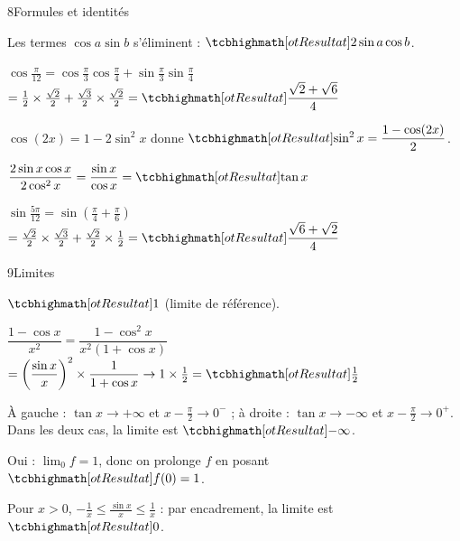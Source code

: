 \begin{deuxcolonnes}
\begin{corrige}{8}{Formules et identités}
\begin{questions}
  \item Les termes $\cos a\sin b$ s'éliminent : $\res{2\sin a\cos b}$.
  \item $\cos\frac{\pi}{12}=\cos\frac{\pi}{3}\cos\frac{\pi}{4}+\sin\frac{\pi}{3}\sin\frac{\pi}{4}$\\
    $=\frac12\times\frac{\sqrt2}{2}+\frac{\sqrt3}{2}\times\frac{\sqrt2}{2}=\res{\dfrac{\sqrt2+\sqrt6}{4}}$
  \item $\cos(2x)=1-2\sin^{2}x$ donne $\res{\sin^{2}x=\dfrac{1-\cos(2x)}{2}}$.
  \item $\dfrac{2\sin x\cos x}{2\cos^{2}x}=\dfrac{\sin x}{\cos x}=\res{\tan x}$
  \item $\sin\frac{5\pi}{12}=\sin\left(\frac{\pi}{4}+\frac{\pi}{6}\right)$\\
    $=\frac{\sqrt2}{2}\times\frac{\sqrt3}{2}+\frac{\sqrt2}{2}\times\frac12=\res{\dfrac{\sqrt6+\sqrt2}{4}}$
\end{questions}
\end{corrige}

\begin{corrige}{9}{Limites}
\begin{questions}
  \item $\res{1}$ (limite de référence).
  \item $\dfrac{1-\cos x}{x^{2}}=\dfrac{1-\cos^{2}x}{x^{2}(1+\cos x)}$\\[1mm]
    $=\left(\dfrac{\sin x}{x}\right)^{2}\times\dfrac{1}{1+\cos x}\to1\times\frac12=\res{\frac12}$
  \item À gauche : $\tan x\to+\infty$ et $x-\frac{\pi}{2}\to0^{-}$ ; à droite : $\tan x\to-\infty$ et $x-\frac{\pi}{2}\to0^{+}$.
    Dans les deux cas, la limite est $\res{-\infty}$.
  \item Oui : $\lim_{0}f=1$, donc on prolonge $f$ en posant $\res{f(0)=1}$.
  \item Pour $x>0$, $-\frac1x\leq\frac{\sin x}{x}\leq\frac1x$ : par encadrement, la limite est $\res{0}$.
\end{questions}
\end{corrige}

\end{deuxcolonnes}

